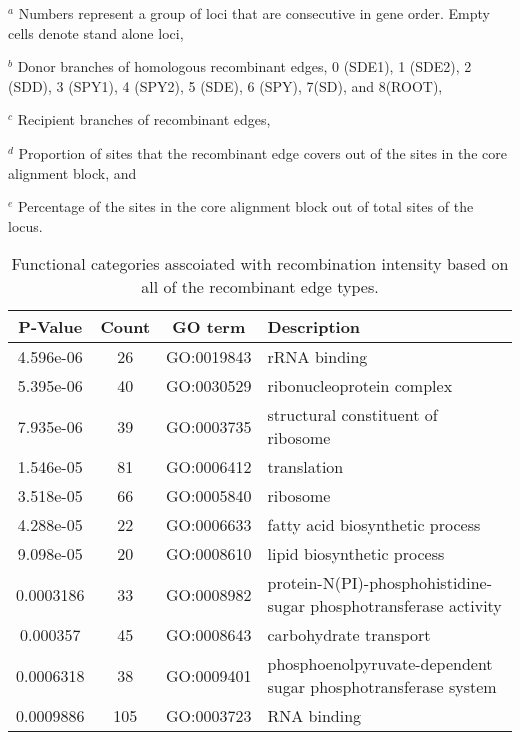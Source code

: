 \documentclass[10pt]{article}
\providecommand{\tabularnewline}{\\}
\begin{document}
\begin{table}
{$^a$ Numbers represent a group of loci that are consecutive in gene order. Empty
cells denote stand alone loci,

$^b$ Donor branches of homologous recombinant edges, 0 (SDE1), 1 (SDE2), 2
(SDD), 3 (SPY1), 4 (SPY2), 5 (SDE), 6 (SPY), 7(SD), and 8(ROOT),

$^c$ Recipient branches of recombinant edges,

$^d$ Proportion of sites that the recombinant edge covers out of the sites in
the core alignment block, and

$^e$ Percentage of the sites in the core alignment block out of total sites of
the locus.
}

\end{table}
\clearpage{}


\begin{table}
\caption{\label{tab:functional-all}Functional categories asscoiated with 
recombination intensity based on all of the recombinant edge types.}
\noindent \begin{centering}
\begin{tabular}{cccl}
\hline 
P-Value & Count & GO term & Description\tabularnewline
\hline 
4.596e-06 & 26 & GO:0019843 & rRNA binding\tabularnewline
5.395e-06 & 40 & GO:0030529 & ribonucleoprotein complex\tabularnewline
7.935e-06 & 39 & GO:0003735 & structural constituent of ribosome\tabularnewline
1.546e-05 & 81 & GO:0006412 & translation\tabularnewline
3.518e-05 & 66 & GO:0005840 & ribosome\tabularnewline
4.288e-05 & 22 & GO:0006633 & fatty acid biosynthetic process\tabularnewline
9.098e-05 & 20 & GO:0008610 & lipid biosynthetic process\tabularnewline
0.0003186 & 33 & GO:0008982 & protein-N(PI)-phosphohistidine-sugar phosphotransferase activity\tabularnewline
0.000357 & 45 & GO:0008643 & carbohydrate transport\tabularnewline
0.0006318 & 38 & GO:0009401 & phosphoenolpyruvate-dependent sugar phosphotransferase system\tabularnewline
0.0009886 & 105 & GO:0003723 & RNA binding\tabularnewline
\hline 
\end{tabular}
\par\end{centering}
\end{table}
\end{document}
